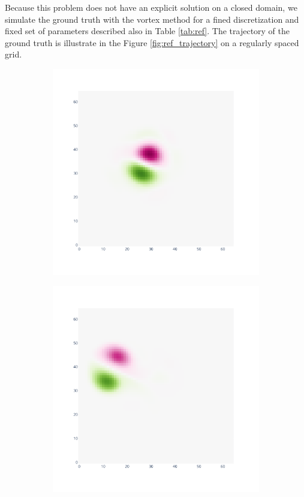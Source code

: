 Because this problem does not have an explicit solution on a closed domain, we simulate the ground truth with the vortex method for a fined discretization and fixed set of parameters described also in Table \ref{tab:ref}. The trajectory of the ground truth is illustrate in the Figure \ref{fig:ref_trajectory} on a regularly spaced grid.

\begin{figure}[htbp]
	\begin{subfigure}{0.32\textwidth}
		\includegraphics[width=\linewidth]{images/app2d/best_estimate_2.pdf}
	\end{subfigure}
	\hfill
	\begin{subfigure}{0.32\textwidth}
		\includegraphics[width=\linewidth]{images/app2d/best_estimate_10.pdf}

\end{subfigure}
\end{figure}
